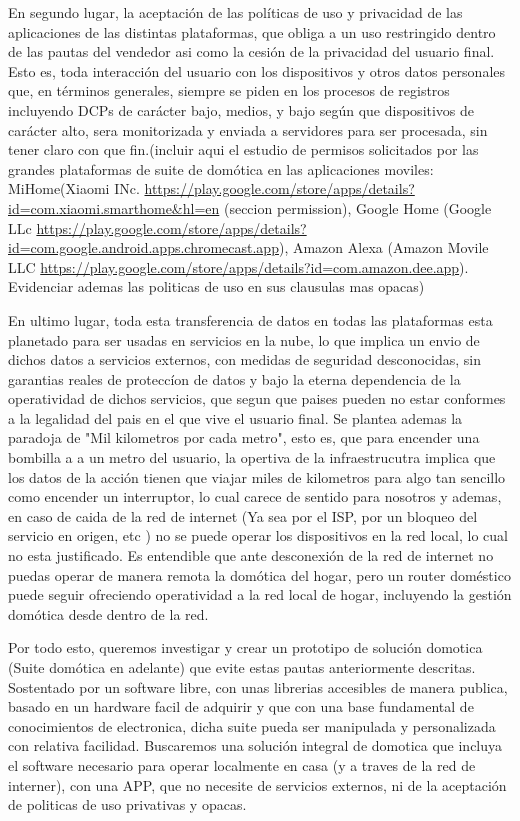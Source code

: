 En segundo lugar, la aceptación de las políticas de uso y privacidad de las aplicaciones de las distintas plataformas, que obliga a un uso restringido dentro de las pautas del vendedor asi como la cesión de la privacidad del usuario final. Esto es, toda interacción del usuario con los dispositivos y otros datos personales que, en términos generales, siempre se piden en los procesos de registros incluyendo DCPs de carácter bajo, medios, y bajo según que dispositivos de carácter alto, sera monitorizada y enviada a servidores para ser procesada, sin tener claro con que fin.(incluir aqui el estudio de permisos solicitados por las grandes plataformas de suite de domótica en las aplicaciones moviles: MiHome(Xiaomi INc. \url{https://play.google.com/store/apps/details?id=com.xiaomi.smarthome&hl=en} (seccion permission), Google Home (Google LLc \url{https://play.google.com/store/apps/details?id=com.google.android.apps.chromecast.app}), Amazon Alexa (Amazon Movile LLC \url{https://play.google.com/store/apps/details?id=com.amazon.dee.app}). Evidenciar ademas las politicas de uso en sus clausulas mas opacas)

En ultimo lugar, toda esta transferencia de datos en todas las plataformas esta planetado para ser usadas en servicios en la nube, lo que implica un envio de dichos datos a servicios externos, con medidas de seguridad desconocidas, sin garantias reales de proteccíon de datos y bajo la eterna dependencia de la operatividad de dichos servicios, que segun que paises pueden no estar conformes a la legalidad del pais en el que vive el usuario final. Se plantea ademas la paradoja de "Mil kilometros por cada metro", esto es, que para encender una bombilla a a un metro del usuario, la opertiva de la infraestrucutra implica que los datos de la acción tienen que viajar miles de kilometros para algo tan sencillo como encender un interruptor, lo cual carece de sentido para nosotros y ademas, en caso de caida de la red de internet (Ya sea por el ISP, por un bloqueo del servicio en origen, etc ) no se puede operar los dispositivos en la red local, lo cual no esta justificado. Es entendible que ante desconexión de la red de internet no puedas operar de manera remota la domótica del hogar, pero un router doméstico puede seguir ofreciendo operatividad a la red local de hogar, incluyendo la gestión domótica desde dentro de la red.

Por todo esto, queremos investigar y crear un prototipo de solución domotica (Suite domótica en adelante) que evite estas pautas anteriormente descritas. Sostentado por un software libre, con unas librerias accesibles de manera publica, basado en un hardware facil de adquirir y que con una base fundamental de conocimientos de electronica, dicha suite pueda ser manipulada y personalizada con relativa facilidad. Buscaremos una solución integral de domotica que incluya el software necesario para operar localmente en casa (y a traves de la red de interner), con una APP, que no necesite de servicios externos, ni de la aceptación de politicas de uso privativas y opacas.

